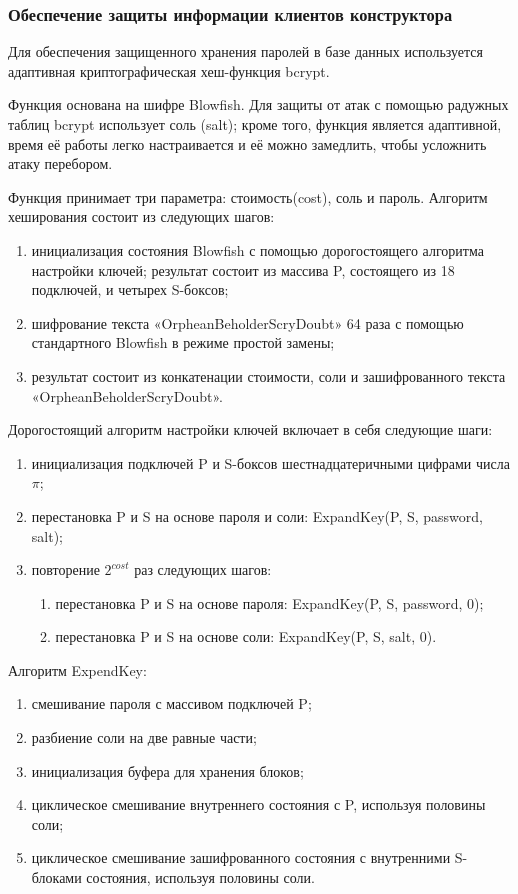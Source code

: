 
\subsubsection{Обеспечение защиты информации клиентов конструктора}

Для обеспечения защищенного хранения паролей в базе данных используется
адаптивная криптографическая хеш-функция bcrypt.

Функция основана на шифре Blowfish.
Для защиты от атак с помощью радужных таблиц bcrypt использует соль (salt);
кроме того, функция является адаптивной,
время её работы легко настраивается и её можно замедлить, чтобы усложнить атаку перебором.

Функция принимает три параметра: стоимость(cost), соль и пароль.
Алгоритм хеширования состоит из следующих шагов:
\begin{enumerate}
	\item
	      инициализация состояния Blowfish с помощью дорогостоящего алгоритма настройки ключей;
	      результат состоит из массива P, состоящего из 18 подключей, и четырех S-боксов;
	\item шифрование текста «OrpheanBeholderScryDoubt» 64 раза с помощью стандартного
	      Blowfish в режиме простой замены;
	\item результат состоит из конкатенации стоимости, соли и зашифрованного текста
	      «OrpheanBeholderScryDoubt».

\end{enumerate}

Дорогостоящий алгоритм настройки ключей включает в себя следующие шаги:
\begin{enumerate}
	\item инициализация подключей P и S-боксов шестнадцатеричными цифрами числа $\pi$;
	\item перестановка P и S на основе пароля и соли: ExpandKey(P, S, password, salt);
	\item повторение $2^{cost}$ раз следующих шагов:
	      \begin{enumerate}
		      \item перестановка P и S на основе пароля: ExpandKey(P, S, password, 0);
		      \item перестановка P и S на основе соли: ExpandKey(P, S, salt, 0).
	      \end{enumerate}
\end{enumerate}

Алгоритм ExpendKey:
\begin{enumerate}
	\item смешивание пароля с массивом подключей P;
	\item
	      разбиение соли на две равные части;
	\item инициализация буфера для хранения блоков;
	\item циклическое смешивание внутреннего состояния с P, используя половины соли;
	\item циклическое смешивание зашифрованного состояния с внутренними S-блоками состояния,
	      используя половины соли.
\end{enumerate}

